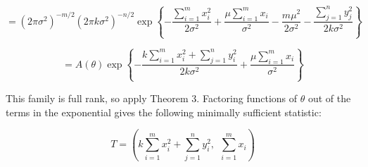 \documentclass{article}
\begin{document}
\[
= (2\pi\sigma^2)^{-m/2}(2\pi k\sigma^2)^{-n/2}
\exp \left\{-\frac{\sum_{i=1}^mx_i^2}{2\sigma^2} +
\frac{\mu\sum_{i=1}^m x_i}{\sigma^2} - \frac{m\mu^2}{2\sigma^2}
-\frac{\sum_{j=1}^n y_j^2}{2k\sigma^2} \right\}
\]

\[
= A(\theta) \exp \left\{-\frac{k\sum_{i=1}^mx_i^2+\sum_{j=1}^ny_i^2}{2k\sigma^2}
+ \frac{\mu\sum_{i=1}^m x_i}{\sigma^2} \right\}
\]

This family is full rank, so apply Theorem 3. Factoring functions of $\theta$
out of the terms
in the exponential gives the following minimally sufficient statistic:

\[
T = \left(k\sum_{i=1}^mx_i^2+\sum_{j=1}^ny_i^2, \ \ \sum_{i=1}^m x_i \right)
\]
\end{document}

